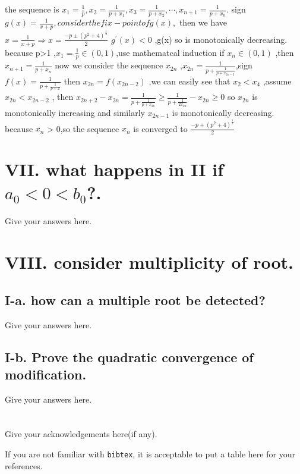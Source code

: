 \documentclass[a4paper]{article}
\begin{document}
the sequence is $x_{1}=\frac{1}{p}, x_{2}=\frac{1}{p+x_{1}},x_{3}= \frac{1}{p+x_{2}},\cdots,x_{n+1}= \frac{1}{p+x_{n}}$.
sign $g(x)=\frac{1}{x+p} ,consider the fix-point of g(x),$ 
then we have $x=\frac{1}{x+p} \Rightarrow x = \frac{-p \pm (p^{2}+4)^{\frac{1}{2}}}{2}$  
$g^{'}(x)<0$ ,g(x) so is monotonically decreasing.
because p>1 ,$x_{1} = \frac{1}{p} \in (0,1) $,use mathematcal induction if $x_{n} \in (0,1)$ ,then $x_{n+1}=\frac{1}{p+x_{n}}$
now we consider the sequence $x_{2n}$ ,$x_{2n}=\frac{1}{p+\frac{1}{p+x_{2n-2}}}$,sign $f(x)=\frac{1}{p+\frac{1}{p+x}}$
then $x_{2n}=f(x_{2n-2})$ ,we can easily see that $x_{2}<x_{4}$ ,assume $x_{2n}<x_{2n-2}$ ,
then $x_{2n+2}-x_{2n}= \frac{1}{p+\frac{1}{p+x_{2n}}} \geq \frac{1}{p+\frac{1}{2x_{2n}}}-x_{2n} \geq 0$
so $x_{2n}$ is monotonically increasing and similarly $x_{2n-1}$ is monotonically decreasing.
because $x_{n}$ > 0,so the sequence $x_{n}$ is converged to $\frac{-p+(p^{2}+4)^{\frac{1}{2}}}{2}$

\section*{VII. what happens in II if $a_{0}<0<b_{0}$?.}

Give your answers here.

\section*{VIII. consider multiplicity of root.}
\subsection*{I-a. how can a multiple root be detected?}
Give your answers here.
\subsection*{I-b. Prove the quadratic convergence of modification.}


Give your answers here.

\section*{  }
Give your acknowledgements here(if any).


\printbibliography

If you are not familiar with \texttt{bibtex}, 
it is acceptable to put a table here for your references.
\end{document}
